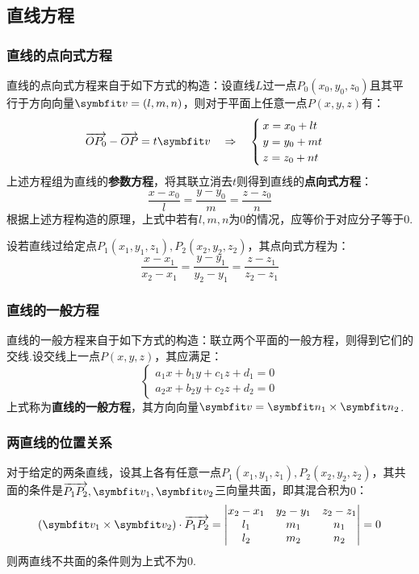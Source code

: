 \subsection{直线方程}
\subsubsection{直线的点向式方程}
直线的点向式方程来自于如下方式的构造：设直线$L$过一点$P_0(x_0,y_0,z_0)$且其平行于方向向量$\vb{v} = (l,m,n)$，则对于平面上任意一点$P(x,y,z)$有：
\[\va{OP_0} - \va{OP} = t\vb{v} \quad\Rightarrow\quad \begin{cases}
    x = x_0 + lt\\
    y = y_0 + mt\\
    z = z_0 + nt
\end{cases}\]
上述方程组为直线的\textbf{参数方程}，将其联立消去$t$则得到直线的\textbf{点向式方程}：
\[\frac{x-x_0}{l} = \frac{y-y_0}{m} = \frac{z-z_0}{n}\]
根据上述方程构造的原理，上式中若有$l,m,n$为$0$的情况，应等价于对应分子等于$0$.

设若直线过给定点$P_1(x_1,y_1,z_1),P_2(x_2,y_2,z_2)$，其点向式方程为：
\[\frac{x-x_1}{x_2-x_1} = \frac{y-y_1}{y_2-y_1} = \frac{z-z_1}{z_2-z_1}\]


\subsubsection{直线的一般方程}
直线的一般方程来自于如下方式的构造：联立两个平面的一般方程，则得到它们的交线.设交线上一点$P(x,y,z)$，其应满足：
\[\begin{cases}
    a_1x + b_1y + c_1z + d_1 = 0\\
    a_2x + b_2y + c_2z + d_2 = 0
\end{cases}\]
上式称为\textbf{直线的一般方程}，其方向向量$\vb{v} = \vb{n}_1 \times \vb{n}_2$.




\subsubsection{两直线的位置关系}
对于给定的两条直线，设其上各有任意一点$P_1(x_1,y_1,z_1),P_2(x_2,y_2,z_2)$，其共面的条件是$\va{P_1P_2},\vb{v}_1,\vb{v}_2$三向量共面，即其混合积为$0$：
\[(\vb{v}_1 \times \vb{v}_2) \cdot \va{P_1P_2} = \begin{vmatrix}
    x_2 - x_1 & y_2-y_1 & z_2-z_1 \\
    l_1 & m_1 & n_1 \\
    l_2 & m_2 & n_2
\end{vmatrix} = 0\]
则两直线不共面的条件则为上式不为$0$.

